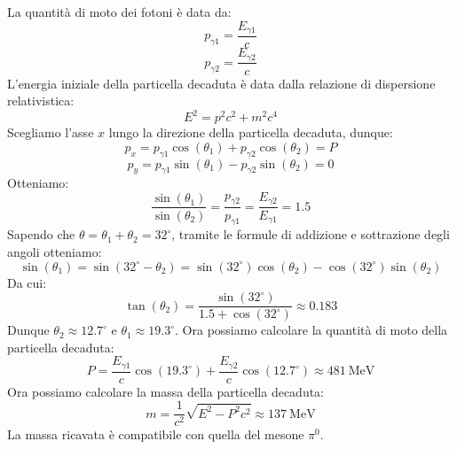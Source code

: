 La quantità di moto dei fotoni è data da:
\begin{equation}
 p_{\gamma1} = \dfrac{E_{\gamma1}}{c}
\end{equation}
\begin{equation}
 p_{\gamma2} = \dfrac{E_{\gamma2}}{c}
\end{equation}
L'energia iniziale della particella decaduta è data dalla relazione di dispersione relativistica:
\begin{equation}
 E^2 = p^2 c^2 + m^2 c^4
\end{equation}
Scegliamo l'asse $x$ lungo la direzione della particella decaduta, dunque:
\begin{equation}
 p_x = p_{\gamma1} \cos(\theta_1) + p_{\gamma2} \cos(\theta_2) = P
\end{equation}
\begin{equation}
 p_y = p_{\gamma1} \sin(\theta_1) - p_{\gamma2} \sin(\theta_2) = 0
\end{equation}
Otteniamo:
\begin{equation}
  \dfrac{\sin(\theta_1)}{\sin(\theta_2)} = \dfrac{p_{\gamma2}}{p_{\gamma1}} = \dfrac{E_{\gamma2}}{E_{\gamma1}} = 1.5
\end{equation}
Sapendo che $\theta = \theta_1 + \theta_2 = 32^\circ$, tramite le formule di addizione e sottrazione degli angoli otteniamo:
\begin{equation}
 \sin(\theta_1) = \sin(32^\circ - \theta_2) = \sin(32^\circ) \cos(\theta_2) - \cos(32^\circ) \sin(\theta_2)
\end{equation}
Da cui:
\begin{equation}
  \tan(\theta_2) = \dfrac{\sin(32^\circ)}{1.5 + \cos(32^\circ)} \approx 0.183
\end{equation}
Dunque $\theta_2 \approx 12.7^\circ$ e $\theta_1 \approx 19.3^\circ$. Ora possiamo calcolare la quantità di moto della particella decaduta:
\begin{equation}
 P = \dfrac{E_{\gamma1}}{c} \cos(19.3^\circ) + \dfrac{E_{\gamma2}}{c} \cos(12.7^\circ) \approx \qty{481}{\mega\electronvolt}
\end{equation}
Ora possiamo calcolare la massa della particella decaduta:
\begin{equation}
 m = \dfrac{1}{c^2} \sqrt{E^2 - P^2 c^2} \approx \qty{137}{\mega\electronvolt}
\end{equation}
La massa ricavata è compatibile con quella del mesone $\pi^0$.
